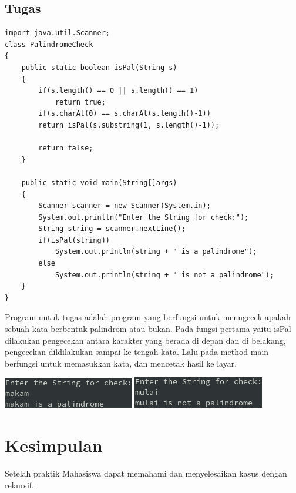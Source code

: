 \documentclass[a4paper,12pt]{article}
\begin{document}
\subsection{Tugas}
\begin{lstlisting}
import java.util.Scanner;
class PalindromeCheck
{
    public static boolean isPal(String s)
    {   
        if(s.length() == 0 || s.length() == 1)
            return true; 
        if(s.charAt(0) == s.charAt(s.length()-1))
        return isPal(s.substring(1, s.length()-1));

        return false;
    }

    public static void main(String[]args)
    {
        Scanner scanner = new Scanner(System.in);
        System.out.println("Enter the String for check:");
        String string = scanner.nextLine();
        if(isPal(string))
            System.out.println(string + " is a palindrome");
        else
            System.out.println(string + " is not a palindrome");
    }
}
\end{lstlisting}
Program untuk tugas adalah program yang berfungsi untuk menngecek apakah sebuah kata berbentuk palindrom atau bukan.
Pada fungsi pertama yaitu isPal dilakukan pengecekan antara karakter yang berada di depan dan di belakang, pengecekan
dildilakukan sampai ke tengah kata. Lalu pada method main berfungsi untuk memasukkan kata, dan mencetak hasil ke layar.

\begin{center}
    \includegraphics[scale=1]{6a.png} 
    \includegraphics[scale=1]{6b.png} 
\end{center}


\newpage

\section{Kesimpulan}
Setelah praktik Mahasiswa dapat memahami dan menyelesaikan kasus dengan rekursif.
\end{document}
